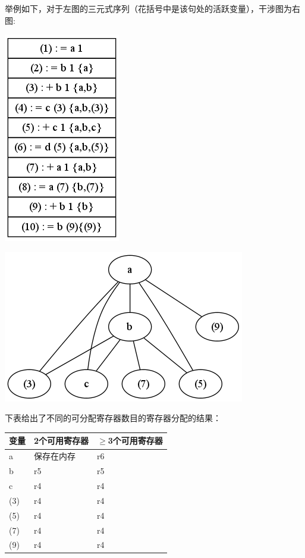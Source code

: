 举例如下，对于左图的三元式序列（花括号中是该句处的活跃变量），干涉图为右图:
\begin{center}

\begin{minipage}{0.4\textwidth}
\begin{center}
	\includegraphics[scale=0.6]{register_allocation_triple.png}
	\label{fig:registerallocationtriple}
\end{center}
\end{minipage}
\begin{minipage}{0.4\textwidth}
\begin{center}
	\includegraphics[scale=0.6]{interference_graph.png}
	\label{fig:interferencegraph}
\end{center}
\end{minipage}
\end{center}
下表给出了不同的可分配寄存器数目的寄存器分配的结果：
\begin{center}
	\begin{tabular}{|l|l|l|}
	\hline
		变量 & 2个可用寄存器 & $\geq$3个可用寄存器 \\
	\hline
		a & 保存在内存 & r6 \\
		b & r5 & r5 \\
		c & r4 & r4 \\
		(3) & r4 & r4 \\
		(5) & r4 & r4 \\
		(7) & r4 & r4 \\
		(9) & r4 & r4 \\
	\hline
	\end{tabular}
\end{center}

